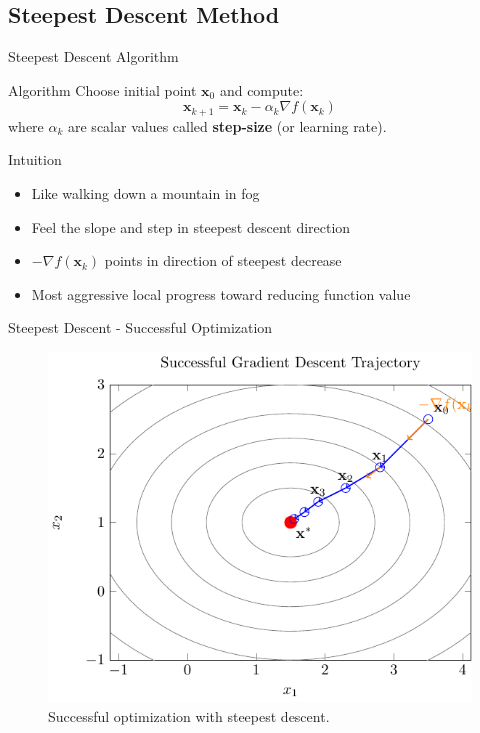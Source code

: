 \documentclass[aspectratio=1610]{beamer}
\begin{document}
\subsection{Steepest Descent Method}

\begin{frame}{Steepest Descent Algorithm}
  \begin{block}{Algorithm}
    Choose initial point $\mathbf{x}_0$ and compute:
    $$\mathbf{x}_{k+1} = \mathbf{x}_k - \alpha_k \nabla f(\mathbf{x}_k)$$
    where $\alpha_k$ are scalar values called \textbf{step-size} (or learning rate).
  \end{block}
  
  \vspace{0.5cm}
  \begin{block}{Intuition}
    \begin{itemize}
      \item Like walking down a mountain in fog
      \item Feel the slope and step in steepest descent direction
      \item $-\nabla f(\mathbf{x}_k)$ points in direction of steepest decrease
      \item Most aggressive local progress toward reducing function value
    \end{itemize}
  \end{block}
\end{frame}

\begin{frame}{Steepest Descent - Successful Optimization}
    \begin{figure}[h]
    \centering
      \includegraphics[height=0.8\textheight]{figures/steepest_successful.pdf}
    \caption{Successful optimization with steepest descent.}
  \end{figure}

\end{frame}
\end{document}
